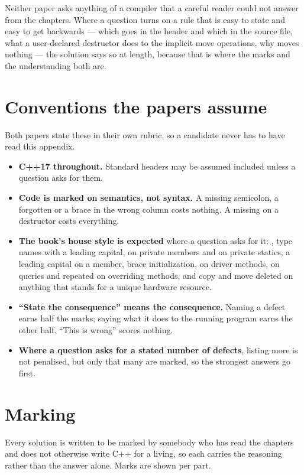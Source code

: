 Neither paper asks anything of a compiler that a careful reader could not answer from the chapters.
Where a question turns on a rule that is easy to state and easy to get backwards --- which
 goes in the header and which in the source file, what a user-declared destructor does
to the implicit move operations, why  moves nothing --- the solution says so at
length, because that is where the marks and the understanding both are.

\section*{Conventions the papers assume}
Both papers state these in their own rubric, so a candidate never has to have read this appendix.
\begin{itemize}
  \item \textbf{C++17 throughout.} Standard headers may be assumed included unless a question asks
    for them.
  \item \textbf{Code is marked on semantics, not syntax.} A missing semicolon, a forgotten
     or a brace in the wrong column costs nothing. A missing  on a
    destructor costs everything.
  \item \textbf{The book's house style is expected} where a question asks for it: ,
    type names with a leading capital,  on private members and  on private
    statics, a leading capital on a  member, brace initialization,
     on driver methods, \code{[[nodiscard]]} on queries and repeated on overriding
    methods, and copy and move deleted on anything that stands for a unique hardware resource.
  \item \textbf{``State the consequence'' means the consequence.} Naming a defect earns half the
    marks; saying what it does to the running program earns the other half. ``This is wrong''
    scores nothing.
  \item \textbf{Where a question asks for a stated number of defects}, listing more is not
    penalised, but only that many are marked, so the strongest answers go first.
\end{itemize}

\section*{Marking}
Every solution is written to be marked by somebody who has read the chapters and does not otherwise
write C++ for a living, so each carries the reasoning rather than the answer alone. Marks are shown
per part.

